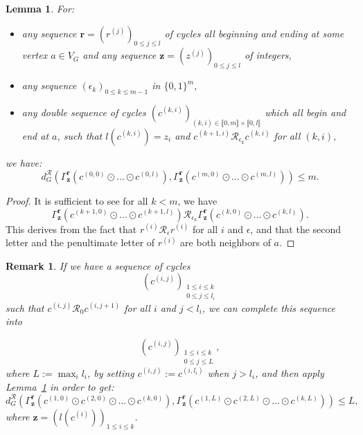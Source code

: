 \documentclass{article}
\newtheorem{lemma}[theorem]{Lemma}
\newtheorem{remark}[theorem]{Remark}
\begin{document}
\begin{lemma} \label{lemma.parallelisation}
For: 
\begin{itemize}
\item any sequence $\textbf{r}=(r^{(j)})_{0 \le j \le l}$ of cycles all beginning and ending at some vertex $a\in V_G$ and any sequence $\textbf{z}=(z^{(j)})_{0 \le j \le l}$ of integers, 
\item any sequence $(\epsilon_k)_{0 \le k \le m-1}$ in $\{0,1\}^{m}$,
\item any double sequence of cycles $(c^{(k,i)})_{(k,i) \in \llbracket 0,m \rrbracket \times \llbracket 0,l\rrbracket}$ which all begin and end at $a$, such that $l\left(c^{(k,i)}\right)=z_i$ and $c^{(k+1,i)} \mathcal{R}_{\epsilon_k} c^{(k,i)}$ for all $(k,i)$,
\end{itemize}
we have:
\[d^{\mathcal{R}}_G(\Gamma^{\textbf{r}}_{\textbf{z}}(c^{(0,0)} \odot \dots \odot c^{(0,l)}), \Gamma^{\textbf{r}}_{\textbf{z}}(c^{(m,0)} \odot \dots \odot c^{(m,l)})) \le m.\] 
\end{lemma} 

\begin{proof}
It is sufficient to see for all $k<m$, we have 
\[\Gamma^{\textbf{r}}_{\textbf{z}}(c^{(k+1,0)} \odot \dots \odot c^{(k+1,l)}) \mathcal{R}_{\epsilon_k} \Gamma^{\textbf{r}}_{\textbf{z}}(c^{(k,0)} \odot \dots \odot c^{(k,l)}).\]
This derives from the fact that $r^{(i)} \mathcal{R}_{\epsilon} r^{(i)}$ for all $i$ and $\epsilon$, and that the second letter and the penultimate letter of $r^{(i)}$ are both neighbors of $a$. 
\end{proof}


\begin{remark}\label{lemma.parallelisation.second}
If we have a sequence of cycles \[
(c^{(i,j)})_{\substack{1 \le i \le k\\0 \le j \le l_i}}
\]
such that $c^{(i,j)} \mathcal{R}_0 c^{(i,j+1)}$  for all $i$ and $j < l_i$, we can complete this sequence into 

\[
(c^{(i,j)})_{\substack{1 \le i \le k\\0 \le j \le L}},
\]
where $L := \max_i l_i$, by setting $c^{(i,j)} := c^{(i,l_i)}$
when $j > l_i$, and then apply Lemma~\ref{lemma.parallelisation}
in order to get: 
\[d^{\mathcal{R}}_G(\Gamma^{\textbf{r}}_{\textbf{z}}(c^{(1,0)}\odot c^{(2,0)} \odot \hdots \odot c^{(k,0)}) , \Gamma^{\textbf{r}}_{\textbf{z}}(c^{(1,L)}\odot c^{(2,L)} \odot \hdots \odot c^{(k,L)}) ) \le L,\]
where $\textbf{z} = (l(c^{(i)}))_{1\leq i\leq k}$.
\end{remark}
\end{document}
